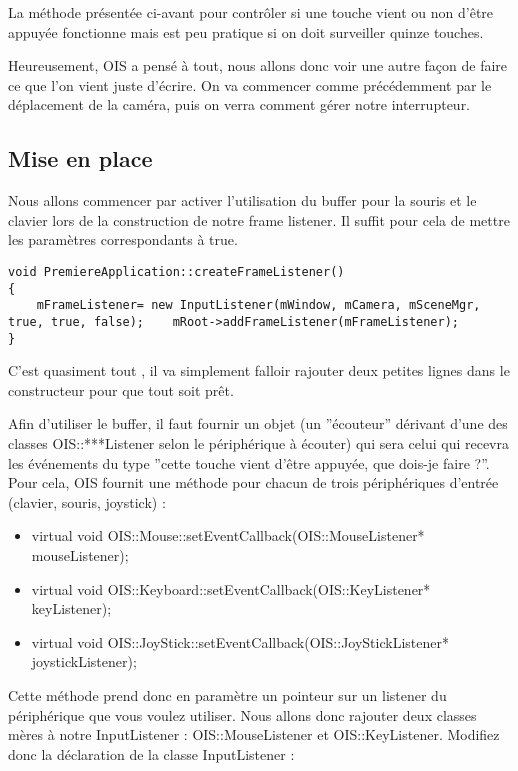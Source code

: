 La m\'ethode pr\'esent\'ee ci-avant pour contr\^oler si une touche vient ou non d'\^etre appuy\'ee fonctionne mais est peu pratique si on doit surveiller quinze touches.

Heureusement, OIS a pens\'e \`a tout, nous allons donc voir une autre fa\c{c}on de faire ce que l'on vient juste d'\'ecrire. On va commencer comme pr\'ec\'edemment par le d\'eplacement de la cam\'era, puis on verra comment g\'erer notre interrupteur.


\subsection{Mise en place}


Nous allons commencer par activer l'utilisation du buffer pour la souris et le clavier lors de la construction de notre frame listener. Il suffit pour cela de mettre les param\`etres correspondants \`a true.


\begin{lstlisting}[caption={Activation du buffer pour la souris et le clavier}]
void PremiereApplication::createFrameListener()
{
    mFrameListener= new InputListener(mWindow, mCamera, mSceneMgr, true, true, false);    mRoot->addFrameListener(mFrameListener);
}
\end{lstlisting}


C'est quasiment tout , il va simplement falloir rajouter deux petites lignes dans le constructeur pour que tout soit pr\^et.

Afin d'utiliser le buffer, il faut fournir un objet (un ''\'ecouteur'' d\'erivant d'une des classes OIS::***Listener selon le p\'eriph\'erique \`a \'ecouter) qui sera celui qui recevra les \'ev\'enements du type ''cette touche vient d'\^etre appuy\'ee, que dois-je faire ?''. Pour cela, OIS fournit une m\'ethode pour chacun de trois p\'eriph\'eriques d'entr\'ee (clavier, souris, joystick) :


\begin{itemize}
\item virtual void OIS::Mouse::setEventCallback(OIS::MouseListener* mouseListener);
\item  virtual void OIS::Keyboard::setEventCallback(OIS::KeyListener* keyListener);
\item  virtual void OIS::JoyStick::setEventCallback(OIS::JoyStickListener* joystickListener);
\end{itemize}

Cette m\'ethode prend donc en param\`etre un pointeur sur un listener du p\'eriph\'erique que vous voulez utiliser. Nous allons donc rajouter deux classes m\`eres \`a notre InputListener : OIS::MouseListener et OIS::KeyListener. Modifiez donc la d\'eclaration de la classe InputListener :

